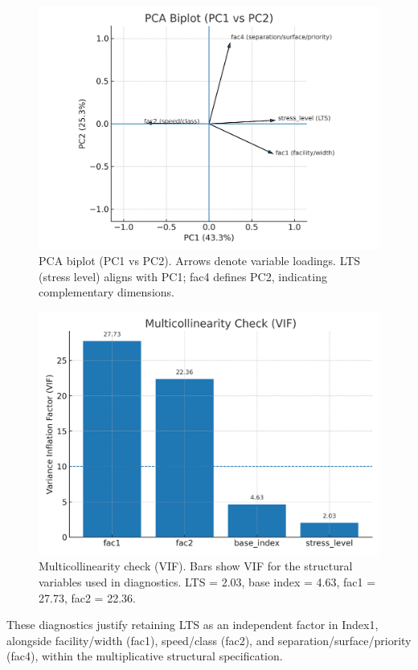 \documentclass[
  12pt,
  oneside]{book}
\begin{document}
\begin{figure}

{\centering \includegraphics[width=0.9\linewidth]{general_images/pca} 

}

\caption{PCA biplot (PC1 vs PC2). Arrows denote variable loadings. LTS (stress level) aligns with PC1; fac4 defines PC2, indicating complementary dimensions.}\label{fig:pca}
\end{figure}

\begin{figure}

{\centering \includegraphics[width=0.75\linewidth]{general_images/vif1} 

}

\caption{Multicollinearity check (VIF). Bars show VIF for the structural variables used in diagnostics. LTS = 2.03, base index = 4.63, fac1 = 27.73, fac2 = 22.36.}\label{fig:vif1}
\end{figure}

These diagnostics justify retaining LTS as an independent factor in Index1, alongside facility/width (fac1), speed/class (fac2), and separation/surface/priority (fac4), within the multiplicative structural specification.
\end{document}
